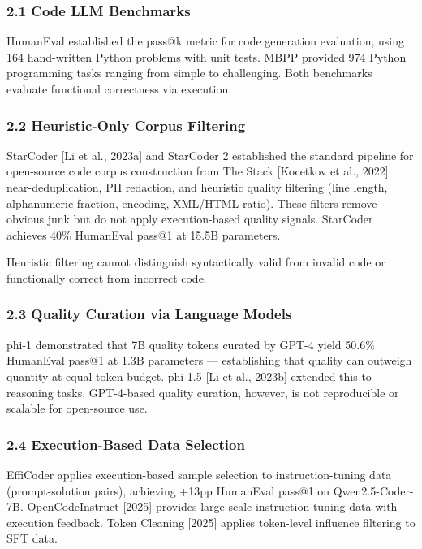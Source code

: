 
\subsubsection{2.1 Code LLM Benchmarks}

HumanEval \citep{Chen2021} established the pass@k metric for code generation evaluation,
using 164 hand-written Python problems with unit tests. MBPP \citep{Austin2021} provided
974 Python programming tasks ranging from simple to challenging. Both benchmarks evaluate
functional correctness via execution.

\subsubsection{2.2 Heuristic-Only Corpus Filtering}

StarCoder [Li et al., 2023a] and StarCoder 2 \citep{Lozhkov2024} established the
standard pipeline for open-source code corpus construction from The Stack [Kocetkov et al.,
2022]: near-deduplication, PII redaction, and heuristic quality filtering (line length,
alphanumeric fraction, encoding, XML/HTML ratio). These filters remove obvious junk but do
not apply execution-based quality signals. StarCoder achieves 40\% HumanEval pass@1 at
15.5B parameters.

Heuristic filtering cannot distinguish syntactically valid from invalid code or functionally
correct from incorrect code.

\subsubsection{2.3 Quality Curation via Language Models}

phi-1 \citep{Gunasekar2023} demonstrated that 7B quality tokens curated by GPT-4 yield
50.6\% HumanEval pass@1 at 1.3B parameters --- establishing that quality can outweigh quantity
at equal token budget. phi-1.5 [Li et al., 2023b] extended this to reasoning tasks.
GPT-4-based quality curation, however, is not reproducible or scalable for open-source use.

\subsubsection{2.4 Execution-Based Data Selection}

EffiCoder \citep{Zeng2024} applies execution-based sample selection to instruction-tuning
data (prompt-solution pairs), achieving +13pp HumanEval pass@1 on Qwen2.5-Coder-7B.
OpenCodeInstruct [2025] provides large-scale instruction-tuning data with execution feedback.
Token Cleaning [2025] applies token-level influence filtering to SFT data.

